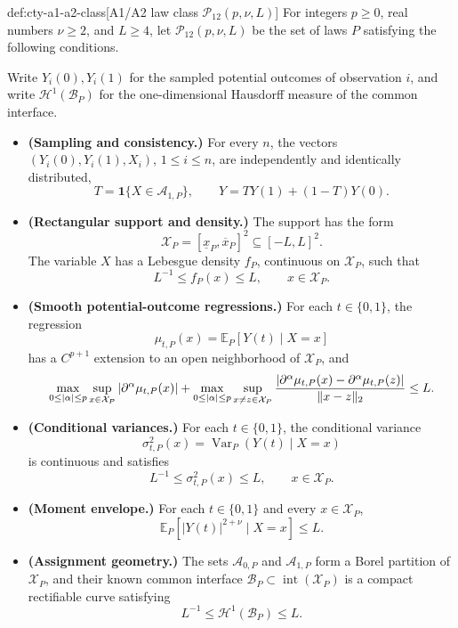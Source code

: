 \documentclass[11pt]{article}
\begin{document}
\begin{definitionv}{def:cty-a1-a2-class}[A1/A2 law class \(\mathcal P_{12}(p,\nu,L)\)]
For integers \(p\geq0\), real numbers \(\nu\geq2\), and \(L\geq4\), let \(\mathcal P_{12}(p,\nu,L)\) be the set of laws \(P\) satisfying the following conditions.

Write \(Y_i(0),Y_i(1)\) for the sampled potential outcomes of observation \(i\), and write \(\mathcal H^1(\mathcal B_P)\) for the one-dimensional Hausdorff measure of the common interface.

\begin{itemize}
\item \textbf{(Sampling and consistency.)} For every \(n\), the vectors \((Y_i(0),Y_i(1),X_i)\), \(1\leq i\leq n\), are independently and identically distributed,
\[
T=\mathbf 1\{X\in\mathcal A_{1,P}\},
\qquad
Y=TY(1)+(1-T)Y(0).
\]

\item \textbf{(Rectangular support and density.)} The support has the form
\[
\mathcal X_P=[\underline x_P,\overline x_P]^2\subseteq[-L,L]^2.
\]
The variable \(X\) has a Lebesgue density \(f_P\), continuous on \(\mathcal X_P\), such that
\[
L^{-1}\leq f_P(x)\leq L,
\qquad x\in\mathcal X_P.
\]

\item \textbf{(Smooth potential-outcome regressions.)} For each \(t\in\{0,1\}\), the regression
\[
\mu_{t,P}(x)=\mathbb E_P[Y(t)\mid X=x]
\]
has a \(C^{p+1}\) extension to an open neighborhood of \(\mathcal X_P\), and
\[
\max_{0\leq|\alpha|\leq p}\sup_{x\in\mathcal X_P}|\partial^\alpha\mu_{t,P}(x)|
+
\max_{0\leq|\alpha|\leq p}\sup_{x\neq z\in\mathcal X_P}
{|\partial^\alpha\mu_{t,P}(x)-\partial^\alpha\mu_{t,P}(z)|
\over
\lVert x-z\rVert_2}
\leq L.
\]

\item \textbf{(Conditional variances.)} For each \(t\in\{0,1\}\), the conditional variance
\[
\sigma^2_{t,P}(x)=\operatorname{Var}_P(Y(t)\mid X=x)
\]
is continuous and satisfies
\[
L^{-1}\leq\sigma^2_{t,P}(x)\leq L,
\qquad x\in\mathcal X_P.
\]

\item \textbf{(Moment envelope.)} For each \(t\in\{0,1\}\) and every \(x\in\mathcal X_P\),
\[
\mathbb E_P[|Y(t)|^{2+\nu}\mid X=x]\leq L.
\]

\item \textbf{(Assignment geometry.)} The sets \(\mathcal A_{0,P}\) and \(\mathcal A_{1,P}\) form a Borel partition of \(\mathcal X_P\), and their known common interface \(\mathcal B_P\subset\operatorname{int}(\mathcal X_P)\) is a compact rectifiable curve satisfying
\[
L^{-1}\leq\mathcal H^1(\mathcal B_P)\leq L.
\]


\end{itemize}
\end{definitionv}
\end{document}
